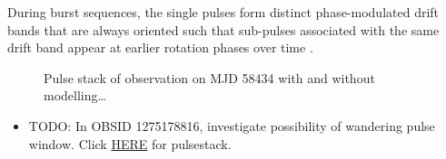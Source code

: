 \documentclass[twocolumn]{aastex631}
\begin{document}
During burst sequences, the single pulses form distinct phase-modulated drift bands that are always oriented such that sub-pulses associated with the same drift band appear at earlier rotation phases over time \citep[`positive drifting' in the classification scheme of][]{Basu2019a}.

\begin{figure*}[!t]
    \caption{Pulse stack of observation on MJD 58434 with and without modelling\dots}
    \label{fig:pulsestack1}
\end{figure*}

\begin{itemize}
    \item TODO: In OBSID 1275178816, investigate possibility of wandering pulse window. Click \href{https://docs.google.com/spreadsheets/d/16bHhlqrGllyq_PD3Fb717MJfGCB1JFrUt2Ra2vPpWQE/edit#gid=619235710}{HERE} for pulsestack.
\end{itemize}

{}



\end{document}
